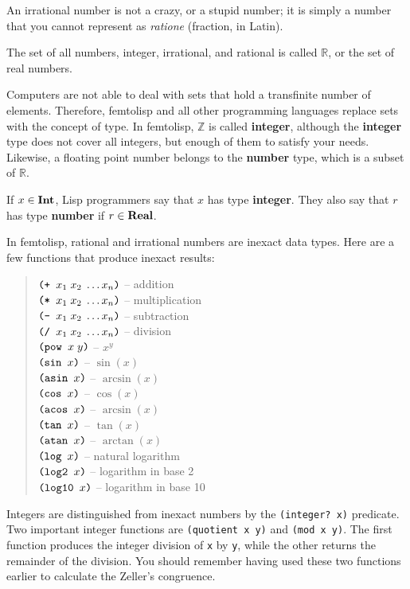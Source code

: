 \documentclass[a4paper,12pt]{book}
\begin{document}
An irrational number
is not a crazy, or a stupid number; it is simply a number that you cannot represent
as {\em ratione} (fraction, in Latin).

The set of all numbers, integer, 
irrational, and rational is called $\mathbb{R}$, or
the set of real numbers. 

Computers are not able to deal
with sets that hold a transfinite number of
elements. Therefore, femtolisp and
all other programming languages
replace sets with the concept of type.
In femtolisp, $\mathbb{Z}$ is 
called {\bf integer}, although
the {\bf integer} type does not cover all integers, 
but enough of them to satisfy
your needs. Likewise, a floating point
number belongs to the {\bf number} type, 
which is a subset of $\mathbb{R}$.


If $x\in{\bf Int}$, Lisp programmers say 
that $x$ has 
type\label{type:definition}  {\bf integer}. 
They also say that $r$ has 
type {\bf number} if $r\in {\bf Real}$.

In femtolisp, rational and irrational numbers
are inexact data types. Here are a few functions
that produce inexact results:
\begin{quote}
	$\verb|(+ |x_1\;x_2\;\ldots x_n\verb|)|$ -- addition\\
	$\verb|(* |x_1\;x_2\;\ldots x_n\verb|)|$ -- multiplication\\
	$\verb|(- |x_1\;x_2\;\ldots x_n\verb|)|$ -- subtraction\\
	$\verb|(/ |x_1\;x_2\;\ldots x_n\verb|)|$ -- division\\
	$\verb|(pow |x\;y\verb|)|$ -- $x^y$\\
	$\verb|(sin | x \verb|)|$ -- $\sin(x)$\\
	$\verb|(asin | x \verb|)|$ -- $\arcsin(x)$\\
	$\verb|(cos | x \verb|)|$ -- $\cos(x)$\\
	$\verb|(acos | x \verb|)|$ -- $\arcsin(x)$\\ 
	$\verb|(tan | x \verb|)|$ -- $\tan(x)$\\
	$\verb|(atan | x \verb|)|$ -- $\arctan(x)$\\
	$\verb|(log | x \verb|)|$ -- natural logarithm\\
	$\verb|(log2 | x \verb|)|$ -- logarithm in base 2\\
	$\verb|(log10 | x \verb|)|$ -- logarithm in base 10
\end{quote}
Integers are distinguished from inexact numbers
by the \verb|(integer? x)| predicate. Two important
integer functions are \verb|(quotient x y)| and
\verb|(mod x y)|. The first function
produces the integer division of \verb|x|
by \verb|y|, while the other returns
the remainder of the division. You should remember
having used
these two functions earlier to calculate the Zeller's
congruence.
\end{document}
